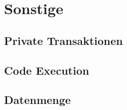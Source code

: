 
\section{Sonstige}

\subsection{Private Transaktionen}

\subsection{Code Execution}

\subsection{Datenmenge}






